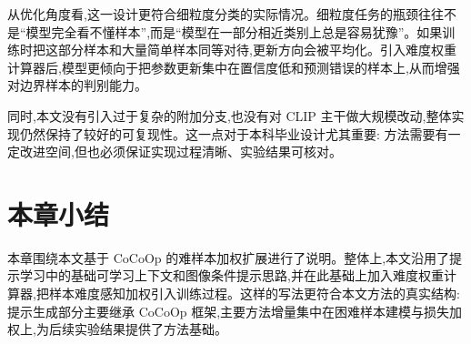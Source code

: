 从优化角度看,这一设计更符合细粒度分类的实际情况。细粒度任务的瓶颈往往不是“模型完全看不懂样本”,而是“模型在一部分相近类别上总是容易犹豫”。如果训练时把这部分样本和大量简单样本同等对待,更新方向会被平均化。引入难度权重计算器后,模型更倾向于把参数更新集中在置信度低和预测错误的样本上,从而增强对边界样本的判别能力。

同时,本文没有引入过于复杂的附加分支,也没有对 CLIP 主干做大规模改动,整体实现仍然保持了较好的可复现性。这一点对于本科毕业设计尤其重要: 方法需要有一定改进空间,但也必须保证实现过程清晰、实验结果可核对。

\section{本章小结}

本章围绕本文基于 CoCoOp 的难样本加权扩展进行了说明。整体上,本文沿用了提示学习中的基础可学习上下文和图像条件提示思路,并在此基础上加入难度权重计算器,把样本难度感知加权引入训练过程。这样的写法更符合本文方法的真实结构: 提示生成部分主要继承 CoCoOp 框架,主要方法增量集中在困难样本建模与损失加权上,为后续实验结果提供了方法基础。
